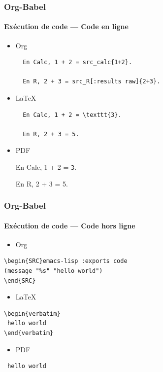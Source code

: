 \documentclass[presentation,t,hideothersubsections]{beamer}
\begin{document}
\begin{frame}[fragile]
\frametitle{Org-Babel}
\framesubtitle{Exécution de code --- Code en ligne}
\label{sec-5-7-4}


\begin{itemize}
\item Org


\lstset{language=org}
\begin{lstlisting}
  En Calc, 1 + 2 = src_calc{1+2}.

  En R, 2 + 3 = src_R[:results raw]{2+3}.
\end{lstlisting}
\item \LaTeX{}


\lstset{language=TeX}
\begin{lstlisting}
  En Calc, 1 + 2 = \texttt{3}.

  En R, 2 + 3 = 5.
\end{lstlisting}
\item PDF

  En Calc, 1 + 2 = \texttt{3}.

  En R, 2 + 3 = 5.
\end{itemize}
\end{frame}
\begin{frame}[fragile]
\frametitle{Org-Babel}
\framesubtitle{Exécution de code --- Code hors ligne}
\label{sec-5-7-5}


\begin{itemize}
\item Org
\end{itemize}


\lstset{language=org}
\begin{lstlisting}
\begin{SRC}emacs-lisp :exports code
(message "%s" "hello world")
\end{SRC}
\end{lstlisting}

\begin{itemize}
\item \LaTeX{}
\end{itemize}


\lstset{language=TeX}
\begin{lstlisting}
\begin{verbatim}
 hello world
\end{verbatim}
\end{lstlisting}

\begin{itemize}
\item PDF
\end{itemize}



\begin{verbatim}
 hello world
\end{verbatim}
\end{frame}
\end{document}
